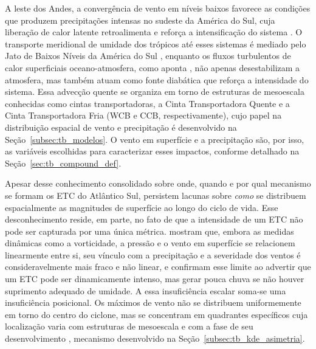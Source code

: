 A leste dos Andes, a convergência de vento em níveis baixos favorece as condições que produzem precipitações intensas no sudeste da América do Sul, cuja liberação de calor latente retroalimenta e reforça a intensificação do sistema \citep{vera2002cold}.
O transporte meridional de umidade dos trópicos até esses sistemas é mediado pelo Jato de Baixos Níveis da América do Sul \citep{reboita2026meteorology}, enquanto os fluxos turbulentos de calor superficiais oceano-atmosfera, como aponta \citet{reboita2022from}, não apenas desestabilizam a atmosfera, mas também atuam como fonte diabática que reforça a intensidade do sistema.
Essa advecção quente se organiza em torno de estruturas de mesoescala conhecidas como cintas transportadoras, a Cinta Transportadora Quente e a Cinta Transportadora Fria (WCB e CCB, respectivamente), cujo papel na distribuição espacial de vento e precipitação é desenvolvido na Seção~\ref{subsec:tb_modelos}.
O vento em superfície e a precipitação são, por isso, as variáveis escolhidas para caracterizar esses impactos, conforme detalhado na Seção~\ref{sec:tb_compound_def}.

Apesar desse conhecimento consolidado sobre onde, quando e por qual mecanismo se formam os ETC do Atlântico Sul, persistem lacunas sobre \emph{como} se distribuem espacialmente as magnitudes de superfície ao longo do ciclo de vida.
Esse desconhecimento reside, em parte, no fato de que a intensidade de um ETC não pode ser capturada por uma única métrica. \citet{corner2025classification} mostram que, embora as medidas dinâmicas como a vorticidade, a pressão e o vento em superfície se relacionem linearmente entre si, seu vínculo com a precipitação e a severidade dos ventos é consideravelmente mais fraco e não linear, e \citet{sinclair2023relationship} confirmam esse limite ao advertir que um ETC pode ser dinamicamente intenso, mas gerar pouca chuva se não houver suprimento adequado de umidade.
A essa insuficiência escalar soma-se uma insuficiência posicional.
Os máximos de vento não se distribuem uniformemente em torno do centro do ciclone, mas se concentram em quadrantes específicos cuja localização varia com estruturas de mesoescala e com a fase de seu desenvolvimento \citep{eisenstein2023identification}, mecanismo desenvolvido na Seção~\ref{subsec:tb_kde_asimetria}.

